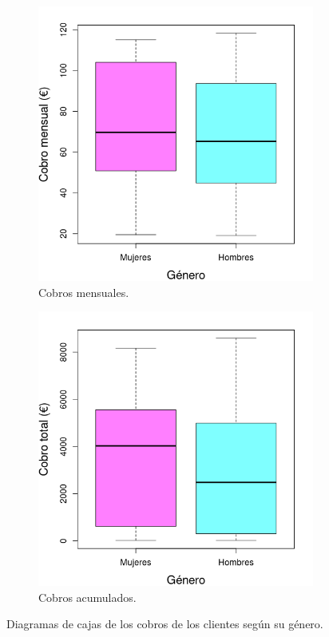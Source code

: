 \documentclass[10pt,a4paper, titlepage]{article}
\begin{document}
\begin{figure}[!htb]
     \centering
     \begin{subfigure}[b]{0.4\textwidth}
         \centering
         \includegraphics[width=\textwidth]{month-gen-box}
         \caption{Cobros mensuales.}
		 \label{fig:month-gen-box}
	 \end{subfigure}\hspace{1cm}
     \begin{subfigure}[b]{0.4\textwidth}
         \centering
         \includegraphics[width=\textwidth]{total-gen-box}
         \caption{Cobros acumulados.}
		 \label{fig:total-gen-box}
     \end{subfigure}
        \caption{Diagramas de cajas de los cobros de los clientes según su género.}
		\label{fig:gen-box}
\end{figure}
\end{document}
